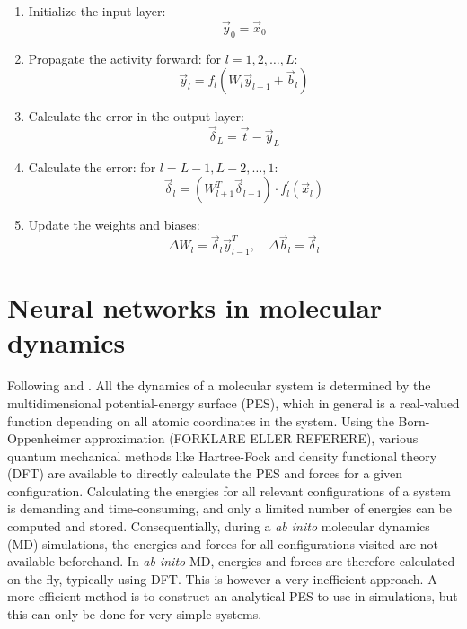 \documentclass[twoside,english]{uiofysmaster}
\begin{document}
\begin{enumerate}
 \item Initialize the input layer:
 \begin{equation}
  \vec{y}_0 = \vec{x}_0
 \end{equation}
 \item Propagate the activity forward: for $l = 1,2,\dots ,L$:
 \begin{equation}
  \vec{y}_l = f_l(W_l\vec{y}_{l-1} + \vec{b}_l)
 \end{equation}
 \item Calculate the error in the output layer:
 \begin{equation}
  \vec{\delta}_L = \vec{t} - \vec{y}_L
 \end{equation}
 \item Calculate the error: for $l = L-1, L-2, \dots ,1$:
 \begin{equation}
 \vec{\delta}_l = (W^T_{l+1}\vec{\delta}_{l+1}) \cdot f_l^\prime (\vec{x}_l)
 \end{equation}
 \item Update the weights and biases: 
 \begin{equation}
  \Delta W_l = \vec{\delta}_l \vec{y}_{l-1}^T, \quad \Delta \vec{b}_l = \vec{\delta}_l
 \end{equation}
\end{enumerate}


\chapter{Neural networks in molecular dynamics}
Following \cite{Behler15} and \cite{Behler11symmetry}.
All the dynamics of a molecular system is determined by the multidimensional potential-energy surface (PES), which
in general is a real-valued function depending on all atomic coordinates in the system. Using the Born-Oppenheimer approximation
(FORKLARE ELLER REFERERE), 
various quantum mechanical methods like Hartree-Fock and density functional theory (DFT) are available to directly calculate
the PES and forces for a given configuration. Calculating the energies for all relevant configurations of a system is
demanding and time-consuming, and only a limited number of energies can be computed and stored. 
Consequentially, during a \textit{ab inito} molecular dynamics (MD) simulations, the energies and forces for all configurations visited
are not available beforehand. In \textit{ab inito} MD, energies and forces are therefore calculated on-the-fly, typically using DFT.
This is however a very inefficient approach. A more efficient method is to construct an analytical PES to use in simulations, 
but this can only be done for very simple systems.
\end{document}
